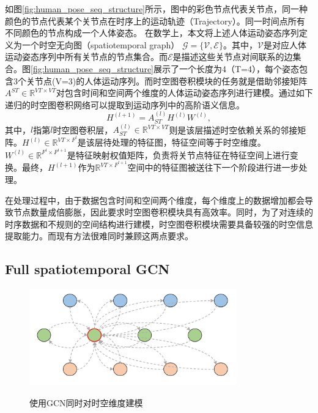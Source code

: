如图\ref{fig:human_pose_seq_structure}所示，图中的彩色节点代表关节点，同一种颜色的节点代表某个关节点在时序上的运动轨迹（Trajectory）。同一时间点所有不同颜色的节点构成一个人体姿态。
在数学上，本文将上述人体运动姿态序列定义为一个时空无向图（spatiotemporal graph） $\mathcal{G} = \{\mathcal{V,E}\}$。其中，$\mathcal{V}$是对应人体运动姿态序列中所有关节点的节点集合。而$\mathcal{E}$是描述这些关节点对间联系的边集合。图\ref{fig:human_pose_seq_structure}展示了一个长度为4（T=4），每个姿态包含3个关节点(V=3)的人体运动序列。而时空图卷积模块的任务就是借助邻接矩阵${A}^{ST} \in \mathbb{R}^{VT\times VT}$对包含时间和空间两个维度的人体运动姿态序列进行建模。通过如下递归的时空图卷积网络可以提取到运动序列中的高阶语义信息。
\begin{equation}
    {H}^{(l+1)}= {A}_{ST}^{(l)}{H}^{(l)}{W}^{(l)},
    \label{equation:graph-conv}
\end{equation}
其中，$l$指第$l$时空图卷积层，${A}_{ST}^{(l)}\in \mathbb{R}^{VT\times VT}$则是该层描述时空依赖关系的邻接矩阵。${H}^{(l)}\in \mathbb{R}^{VT\times F^l}$是该层待处理的特征图，特征空间等于时空维度。${W}^{(l)}\in \mathbb{R}^{F^l\times F^{l+1}}$是特征映射权值矩阵，负责将关节点特征在特征空间上进行变换。最终，${H}^{(l+1)}$作为$\mathbb{R}^{VT\times F^{l+1}}$空间中的特征图被送往下一个阶段进行进一步处理。

在处理过程中，由于数据包含时间和空间两个维度，每个维度上的数据增加都会导致节点数量成倍膨胀，因此要求时空图卷积模块具有高效率。同时，为了对连续的时序数据和不规则的空间结构进行建模，时空图卷积模块需要具备较强的时空信息提取能力。而现有方法很难同时兼顾这两点要求。

\subsection{Full spatiotemporal GCN}
\begin{figure}[ht]
    \centering
    \includegraphics[width=0.80\textwidth]{FigMa/original_gcn.png}\\
    \vspace{-0.3cm}
    \caption{使用GCN同时对时空维度建模}
    \label{fig:original_gcn_structure}
\end{figure}

